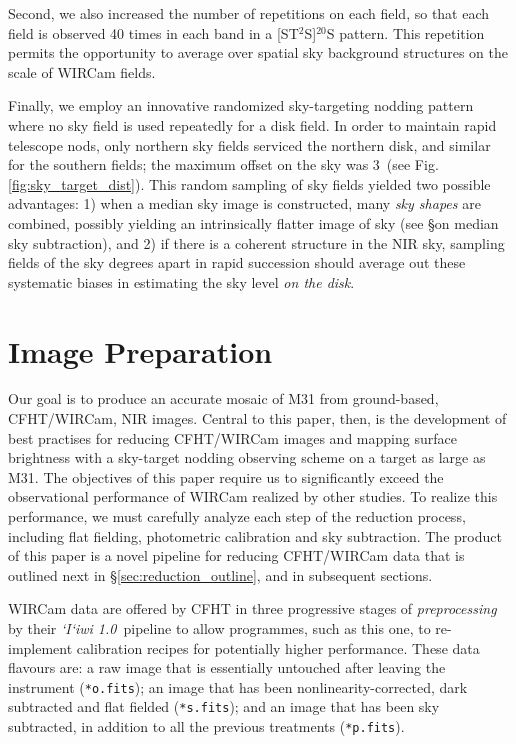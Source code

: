 \documentclass[iop]{emulateapj}
\newcommand{\sw}[1]{\textit{#1}} %
\newcommand{\iiwione}{\sw{`I`iwi 1.0}}
\newcommand{\androids}{\textsc{androids}}
\begin{document}
Second, we also increased the number of repetitions on each field, so that each field is observed 40 times in each band in a [ST$^2$S]$^{20}$S pattern. This repetition permits the opportunity to average over spatial sky background structures on the scale of WIRCam fields.

Finally, we employ an innovative randomized sky-targeting nodding pattern where no sky field is used repeatedly for a disk field. In order to maintain rapid telescope nods, only northern sky fields serviced the northern disk, and similar for the southern fields; the maximum offset on the sky was 3\arcdeg\ (see Fig. \ref{fig:sky_target_dist}). This random sampling of sky fields yielded two possible advantages: 1) when a median sky image is constructed, many \emph{sky shapes} are combined, possibly yielding an intrinsically flatter image of sky (see \S on median sky subtraction), and 2) if there is a coherent structure in the NIR sky, sampling fields of the sky degrees apart in rapid succession should average out these systematic biases in estimating the sky level \emph{on the disk}.


\section{Image Preparation}
\label{sec:reduction}

Our goal is to produce an accurate mosaic of M31 from ground-based, CFHT/WIRCam, NIR images.
Central to this paper, then, is the development of best practises for reducing CFHT/WIRCam images and mapping surface brightness with a sky-target nodding observing scheme on a target as large as M31.
The objectives of this paper require us to significantly exceed the observational performance of WIRCam realized by other studies.
To realize this performance, we must carefully analyze each step of the reduction process, including flat fielding, photometric calibration and sky subtraction.
The product of this paper is a novel pipeline for reducing CFHT/WIRCam data that is outlined next in \S\ref{sec:reduction_outline}, and in subsequent sections.

WIRCam data are offered by CFHT in three progressive stages of \emph{preprocessing} by their \iiwione\ pipeline to allow programmes, such as this one, to re-implement calibration recipes for potentially higher performance.
These data flavours are: a raw image that is essentially untouched after leaving the instrument (\texttt{*o.fits}); an image that has been nonlinearity-corrected, dark subtracted and flat fielded (\texttt{*s.fits}); and an image that has been sky subtracted, in addition to all the previous treatments (\texttt{*p.fits}).
\end{document}
